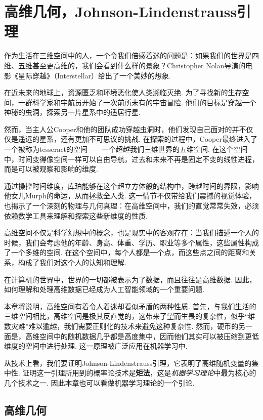  \chapter{高维几何，Johnson-Lindenstrauss引理}\label{chap:J-L-Lemma}

作为生活在三维空间中的人，一个令我们倍感着迷的问题是：如果我们的世界是四维、五维甚至更高维的，我们会看到什么样的景象？Christopher Nolan导演的电影《星际穿越》（Interstellar）给出了一个美妙的想象. 

在近未来的地球上，资源匮乏和环境恶化使人类濒临灭绝. 为了寻找新的生存空间，一群科学家和宇航员开始了一次前所未有的宇宙冒险. 他们的目标是穿越一个神秘的虫洞，探索另一片星系中的适居行星. 

然而，当主人公Cooper和他的团队成功穿越虫洞时，他们发现自己面对的并不仅仅是遥远的星系，还有更加不可思议的挑战. 在探索的过程中，Cooper最终进入了一个被称为tesseract的空间——一个超越我们三维世界的五维空间. 在这个空间中，时间变得像空间一样可以自由导航，过去和未来不再是固定不变的线性进程，而是可以被观察和影响的维度. 

通过操控时间维度，库珀能够在这个超立方体般的结构中，跨越时间的界限，影响他女儿Murph的命运，从而拯救全人类. 这一情节不仅带给我们震撼的视觉体验，也揭示了一个深刻的物理与几何真理：在高维空间中，我们的直觉常常失效，必须依赖数学工具来理解和探索这些新维度的性质. 

高维空间不仅是科学幻想中的概念，也是现实中的客观存在：当我们描述一个人的时候，我们会考虑他的年龄、身高、体重、学历、职业等多个属性，这些属性构成了一个多维的空间. 在这个空间中，每个人都是一个点，而这些点之间的距离和关系，构成了我们对这个人的认知和理解. 

在计算机的世界中，世界的一切都被表示为了数据，而且往往是高维数据. 因此，如何理解和处理高维数据已经成为人工智能领域的一个重要问题. 

本章将说明，高维空间有着令人着迷却看似矛盾的两种性质. 首先，与我们生活的三维空间相比，高维空间是极其反直觉的，这带来了望而生畏的复杂性，似乎“维数灾难”难以逾越，我们需要正则化的技术来避免这种复杂性. 然而，硬币的另一面是，高维空间中的随机数据几乎都是高度集中，因而他们其实可以被压缩到更低维度的空间中进行处理. 这一原理被广泛应用在机器学习中. 

从技术上看，我们要证明Johnson-Lindenstrauss引理，它表明了高维随机变量的集中性. 证明这一引理所用到的概率论技术是\textbf{矩法}，这是\textit{机器学习理论}中最为核心的几个技术之一. 因此本章也可以看做机器学习理论的一个引论. 

\section{高维几何}

